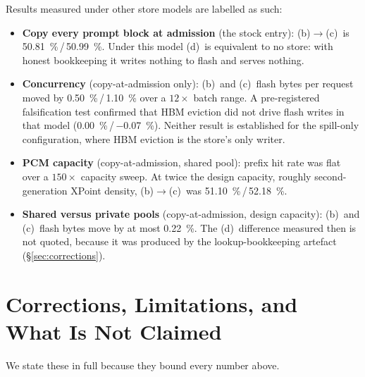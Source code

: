 \documentclass[conference]{IEEEtran}
\newcommand{\cfgb}{\textsf{(b)}}
\newcommand{\cfgc}{\textsf{(c)}}
\newcommand{\cfgd}{\textsf{(d)}}
\begin{document}
Results measured under other store models are labelled as such:
\begin{itemize}
  \item \textbf{Copy every prompt block at admission} (the stock entry):
        \cfgb$\to$\cfgc\ is \SI{50.81}{\percent}\,/\,\SI{50.99}{\percent}.
        Under this model \cfgd\ is equivalent to no store: with honest
        bookkeeping it writes nothing to flash and serves nothing.
  \item \textbf{Concurrency} (copy-at-admission only): \cfgb\ and \cfgc\ flash
        bytes per request moved by \SI{0.50}{\percent}\,/\,\SI{1.10}{\percent}
        over a $12\times$ batch range. A pre-registered falsification test
        confirmed that HBM eviction did not drive flash writes in that model
        (\SI{+0.00}{\percent}\,/\,\SI{-0.07}{\percent}). Neither result is
        established for the spill-only configuration, where HBM eviction is the
        store's only writer.
  \item \textbf{PCM capacity} (copy-at-admission, shared pool): prefix hit rate
        was flat over a $150\times$ capacity sweep. At twice the design
        capacity, roughly second-generation XPoint density,
        \cfgb$\to$\cfgc\ was \SI{51.10}{\percent}\,/\,\SI{52.18}{\percent}.
  \item \textbf{Shared versus private pools} (copy-at-admission, design
        capacity): \cfgb\ and \cfgc\ flash bytes move by at most
        \SI{0.22}{\percent}. The \cfgd\ difference measured then is not quoted,
        because it was produced by the lookup-bookkeeping artefact
        (\S\ref{sec:corrections}).
\end{itemize}

\section{Corrections, Limitations, and What Is Not Claimed}\label{sec:limits}
We state these in full because they bound every number above.
\end{document}
